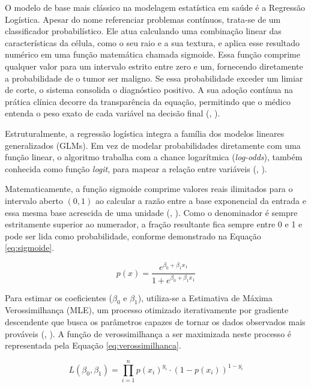 \documentclass[
    12pt
    ,oneside
    ,a4paper
    ,chapter=TITLE
    ,section=TITLE
    ,sumario=abnt-6027-2012
    ,english,brazil]{abntex2} %
\begin{document}
O modelo de base mais clássico na modelagem estatística em saúde é a Regressão Logística. Apesar do nome referenciar problemas contínuos, trata-se de um classificador probabilístico. Ele atua calculando uma combinação linear das características da célula, como o seu raio e a sua textura, e aplica esse resultado numérico em uma função matemática chamada sigmoide. Essa função comprime qualquer valor para um intervalo estrito entre zero e um, fornecendo diretamente a probabilidade de o tumor ser maligno. Se essa probabilidade exceder um limiar de corte, o sistema consolida o diagnóstico positivo. A sua adoção contínua na prática clínica decorre da transparência da equação, permitindo que o médico entenda o peso exato de cada variável na decisão final (, \citeyear{Bishop2006}).

Estruturalmente, a regressão logística integra a família dos modelos lineares generalizados (GLMs). Em vez de modelar probabilidades diretamente com uma função linear, o algoritmo trabalha com a chance logarítmica (\textit{log-odds}), também conhecida como função \textit{logit}, para mapear a relação entre variáveis (, \citeyear{ibm_logistic_regression_2026}).

Matematicamente, a função sigmoide comprime valores reais ilimitados para o intervalo aberto $(0, 1)$ ao calcular a razão entre a base exponencial da entrada e essa mesma base acrescida de uma unidade (, \citeyear{ibm_logistic_regression_2026}). Como o denominador é sempre estritamente superior ao numerador, a fração resultante fica sempre entre 0 e 1 e pode ser lida como probabilidade, conforme demonstrado na Equação \ref{eq:sigmoide}.

\begin{equation}
\label{eq:sigmoide}
p(x) = \frac{e^{\beta_0 + \beta_1 x_1}}{1 + e^{\beta_0 + \beta_1 x_1}}
\end{equation}

Para estimar os coeficientes ($\beta_0$ e $\beta_1$), utiliza-se a Estimativa de Máxima Verossimilhança (MLE), um processo otimizado iterativamente por gradiente descendente que busca os parâmetros capazes de tornar os dados observados mais prováveis (, \citeyear{ibm_logistic_regression_2026}). A função de verossimilhança a ser maximizada neste processo é representada pela Equação \ref{eq:verossimilhanca}.

\begin{equation}
\label{eq:verossimilhanca}
L(\beta_0, \beta_1) = \prod_{i=1}^n p(x_i)^{y_i} \cdot (1 - p(x_i))^{1 - y_i}
\end{equation}
\end{document}
